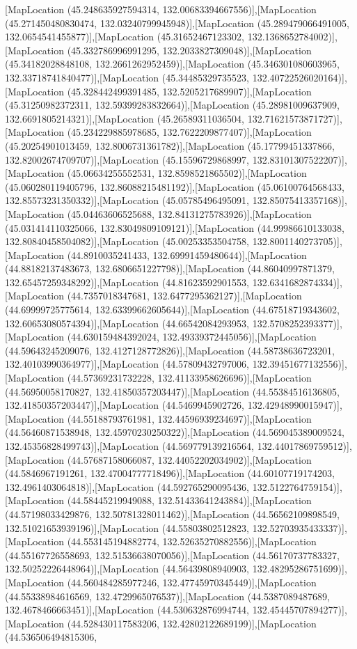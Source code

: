 [MapLocation (45.248635927594314, 132.00683394667556)],[MapLocation (45.271450480830474, 132.03240799945948)],[MapLocation (45.289479066491005, 132.0654541455877)],[MapLocation (45.31652467123302, 132.1368652784002)],[MapLocation (45.332786996991295, 132.2033827309048)],[MapLocation (45.34182028848108, 132.2661262952459)],[MapLocation (45.346301080603965, 132.33718741840477)],[MapLocation (45.34485329735523, 132.40722526020164)],[MapLocation (45.328442499391485, 132.5205217689907)],[MapLocation (45.31250982372311, 132.59399283832664)],[MapLocation (45.28981009637909, 132.6691805214321)],[MapLocation (45.26589311036504, 132.71621573871727)],[MapLocation (45.234229885978685, 132.7622209877407)],[MapLocation (45.20254901013459, 132.8006731361782)],[MapLocation (45.17799451337866, 132.82002674709707)],[MapLocation (45.15596729868997, 132.83101307522207)],[MapLocation (45.06634255552531, 132.8598521865502)],[MapLocation (45.060280119405796, 132.86088215481192)],[MapLocation (45.06100764568433, 132.85573231350332)],[MapLocation (45.05785496495091, 132.85075413357168)],[MapLocation (45.04463606525688, 132.84131275783926)],[MapLocation (45.031414110325066, 132.83049809109121)],[MapLocation (44.99986610133038, 132.80840458504082)],[MapLocation (45.00253353504758, 132.8001140273705)],[MapLocation (44.8910035241433, 132.69991459480644)],[MapLocation (44.88182137483673, 132.6806651227798)],[MapLocation (44.86040997871379, 132.65457259348292)],[MapLocation (44.81623592901553, 132.6341682874334)],[MapLocation (44.7357018347681, 132.6477295362127)],[MapLocation (44.69999725775614, 132.63399662605644)],[MapLocation (44.67518719343602, 132.60653080574394)],[MapLocation (44.66542084293953, 132.5708252393377)],[MapLocation (44.630159484392024, 132.49339372445056)],[MapLocation (44.59643245209076, 132.4127128772826)],[MapLocation (44.58738636723201, 132.40103990364977)],[MapLocation (44.57809432797006, 132.39451677132556)],[MapLocation (44.57369231732228, 132.41133958626696)],[MapLocation (44.56950058170827, 132.41850357203447)],[MapLocation (44.55384516136805, 132.41850357203447)],[MapLocation (44.5469945902726, 132.42948990015947)],[MapLocation (44.55188793761981, 132.44596939234697)],[MapLocation (44.56460871538948, 132.45970230250322)],[MapLocation (44.569045389009524, 132.45356828499743)],[MapLocation (44.569779139216564, 132.44017869759512)],[MapLocation (44.57687158066087, 132.44052202034902)],[MapLocation (44.5846967191261, 132.47004777718496)],[MapLocation (44.60107719174203, 132.4961403064818)],[MapLocation (44.592765290095436, 132.5122764759154)],[MapLocation (44.58445219949088, 132.51433641243884)],[MapLocation (44.57198033429876, 132.50781328011462)],[MapLocation (44.56562109898549, 132.51021653939196)],[MapLocation (44.55803802512823, 132.52703935433337)],[MapLocation (44.553145194882774, 132.52635270882556)],[MapLocation (44.55167726558693, 132.51536638070056)],[MapLocation (44.56170737783327, 132.50252226448964)],[MapLocation (44.56439808940903, 132.48295286751699)],[MapLocation (44.560484285977246, 132.47745970345449)],[MapLocation (44.55338984616569, 132.4729965076537)],[MapLocation (44.5387089487689, 132.4678466663451)],[MapLocation (44.530632876994744, 132.45445707894277)],[MapLocation (44.528430117583206, 132.42802122689199)],[MapLocation (44.536506494815306, 